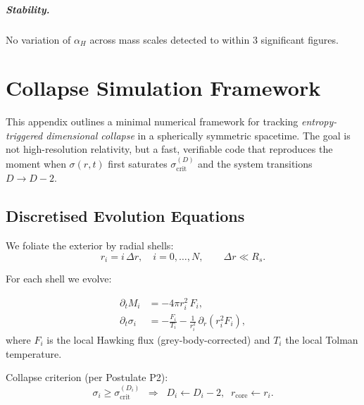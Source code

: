 \documentclass[a4paper, 12pt, oneside]{book}
\numberwithin{equation}{chapter}
\begin{document}
\paragraph{Stability.}
No variation of \( \alpha_H \) across mass scales detected to within 3 significant figures.




\chapter{Collapse Simulation Framework}
\label{app:SimFramework}

\noindent
This appendix outlines a minimal numerical framework for tracking
\emph{entropy-triggered dimensional collapse} in a spherically symmetric
spacetime.  The goal is not high-resolution relativity, but a fast,
verifiable code that reproduces the moment when $\sigma(r,t)$ first
saturates $\sigma_{\text{crit}}^{(D)}$ and the system transitions
$D \!\to\! D{-}2$.

\section{Discretised Evolution Equations}
\label{sec:Discretisation}

We foliate the exterior by radial shells:
\[
    r_i = i\,\Delta r, \quad i = 0,\dots,N,
    \qquad \Delta r \ll R_s .
\]

For each shell we evolve:

\[
\begin{aligned}
    \partial_t M_i &= -4\pi r_i^2 \, F_i,\\[2pt]
    \partial_t \sigma_i &= -\frac{F_i}{T_i} 
         - \frac{1}{r_i^2}\,\partial_r\!\left(r_i^2 F_i\right),
\end{aligned}
\]
where  
$F_i$ is the local Hawking flux (grey-body-corrected) \cite{Page1976} and
$T_i$ the local Tolman temperature.

Collapse criterion (per Postulate P2):
\[
    \sigma_i \ge \sigma_{\text{crit}}^{(D_i)}
    \;\;\Longrightarrow\;\;
    D_i \leftarrow D_i - 2,
    \;\;
    r_{\text{core}} \leftarrow r_i .
\]
\end{document}
